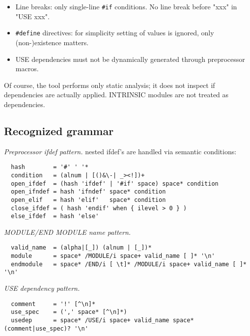 \documentclass[DIV16]{scrartcl}
\begin{document}
\begin{itemize}
\item Line breaks: only single-line \texttt{\#if} conditions. No line
  break before "xxx" in "USE xxx".
\item \texttt{\#define} directives: for simplicity setting of values is
  ignored, only (non-)existence matters.
\item USE dependencies must not be dynamically generated through
  preprocessor macros.
\end{itemize}

Of course, the tool performs only static analysis; it does not inspect
if dependencies are actually applied. INTRINSIC modules are not
treated as dependencies.


\subsection{Recognized grammar}

\noindent\emph{Preprocessor ifdef pattern.}
nested ifdef's are handled via semantic conditions:

{\small\begin{verbatim}
  hash        = '#' ' '*
  condition   = (alnum | [()&\-| _><!])+   
  open_ifdef  = (hash 'ifdef' | '#if' space) space* condition
  open_ifndef = hash 'ifndef' space* condition
  open_elif   = hash 'elif'   space* condition
  close_ifdef = ( hash 'endif' when { ilevel > 0 } ) 
  else_ifdef  = hash 'else' 
\end{verbatim}}

\noindent\emph{MODULE/END MODULE name pattern.}

{\small\begin{verbatim}
  valid_name  = (alpha|[_]) (alnum | [_])* 
  module      = space* /MODULE/i space+ valid_name [ ]* '\n'
  endmodule   = space* /END/i [ \t]* /MODULE/i space+ valid_name [ ]* '\n'
\end{verbatim}}

\noindent\emph{USE dependency pattern.}

{\small\begin{verbatim}
  comment     = '!' [^\n]* 
  use_spec    = (',' space* [^\n]*)
  usedep      = space* /USE/i space+ valid_name space* (comment|use_spec)? '\n'
\end{verbatim}}
\end{document}
